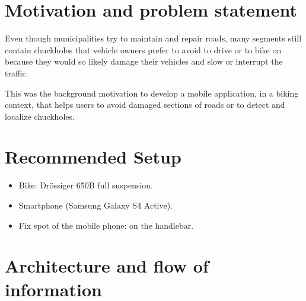 \documentclass[10pt,a4paper]{article} %
\begin{document}
    \pagestyle{plain}
    \title{\rmfamily\normalfont{}}
    \author{}
    \date{} %
    
    \maketitle
    
       
    \tableofcontents
\newpage    
    \section{Motivation and problem statement}



Even though municipalities try to maintain and repair roads, many segments still contain chuckholes that vehicle owners prefer to avoid to drive or to bike on because they would so likely damage their vehicles and slow or interrupt the traffic.

This was the background motivation to develop a mobile application, in a biking context, that helps users to avoid damaged sections of roads or to detect and localize chuckholes.

 
 
 
 
    \section{Recommended Setup}
	\begin{itemize} 
	\item Bike: Drössiger 650B full suspension.
	\item Smartphone (Samsung Galaxy S4 Active).
	\item Fix spot of the mobile phone: on the handlebar.
	
	
	\end{itemize}


    \section{Architecture and flow of information}
	
\end{document}
